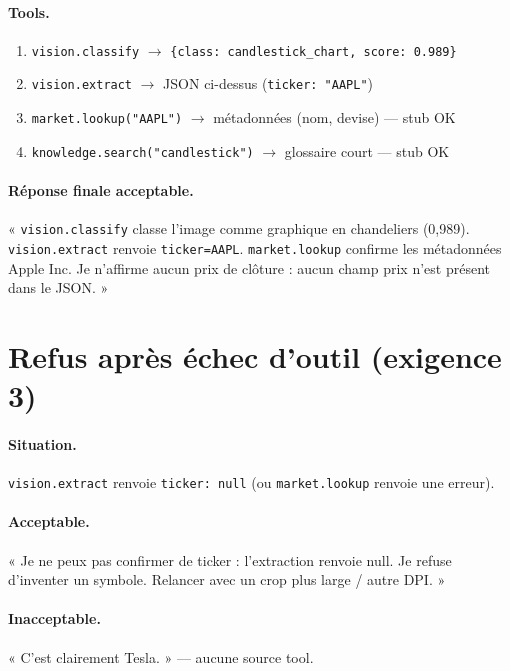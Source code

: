 \documentclass[11pt,a4paper]{article}
\begin{document}
\paragraph{Tools.}
\begin{enumerate}
  \item \texttt{vision.classify} $\rightarrow$ \texttt{\{class: candlestick\_chart, score: 0.989\}}
  \item \texttt{vision.extract} $\rightarrow$ JSON ci-dessus (\texttt{ticker: "AAPL"})
  \item \texttt{market.lookup("AAPL")} $\rightarrow$ métadonnées (nom, devise) --- stub OK
  \item \texttt{knowledge.search("candlestick")} $\rightarrow$ glossaire court --- stub OK
\end{enumerate}

\paragraph{Réponse finale acceptable.}
« \texttt{vision.classify} classe l'image comme graphique en chandeliers (0{,}989).
\texttt{vision.extract} renvoie \texttt{ticker=AAPL}.
\texttt{market.lookup} confirme les métadonnées Apple Inc.
Je n'affirme aucun prix de clôture : aucun champ prix n'est présent dans le JSON. »

\section{Refus après échec d'outil (exigence 3)}

\paragraph{Situation.} \texttt{vision.extract} renvoie \texttt{ticker: null}
(ou \texttt{market.lookup} renvoie une erreur).

\paragraph{Acceptable.}
« Je ne peux pas confirmer de ticker : l'extraction renvoie null.
Je refuse d'inventer un symbole. Relancer avec un crop plus large / autre DPI. »

\paragraph{Inacceptable.}
« C'est clairement Tesla. » --- aucune source tool.
\end{document}
